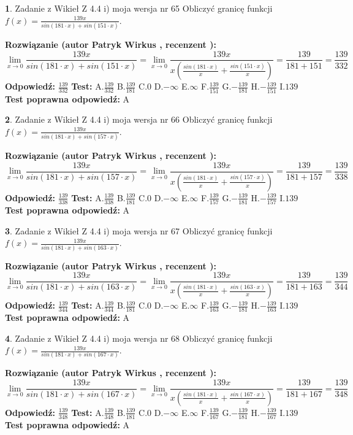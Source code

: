\documentclass[12pt, a4paper]{article}
\theoremstyle{definition} %
\newtheorem{zad}{}
\newcommand{\zadStart}[1]{\begin{zad}#1\newline}
\newcommand{\zadStop}{\end{zad}}
\newcommand{\rozwStart}[2]{\noindent \textbf{Rozwiązanie (autor #1 , recenzent #2): }\newline}
\newcommand{\rozwStop}{\newline}
\newcommand{\odpStart}{\noindent \textbf{Odpowiedź:}\newline}
\newcommand{\odpStop}{\newline}
\newcommand{\testStart}{\noindent \textbf{Test:}\newline}
\newcommand{\testStop}{\newline}
\newcommand{\kluczStart}{\noindent \textbf{Test poprawna odpowiedź:}\newline}
\newcommand{\kluczStop}{\newline}
\begin{document}
\zadStart{Zadanie z Wikieł Z 4.4 i) moja wersja nr 65}
Obliczyć granicę funkcji $f(x)=\frac{139x}{sin(181\cdot x) +sin(151\cdot x)}$.
\zadStop
\rozwStart{Patryk Wirkus}{}
$$\lim\limits_{x\to 0}\frac{139x}{sin(181\cdot x) +sin(151\cdot x)}=\lim\limits_{x\to 0}\frac{139x}{x(\frac{sin(181\cdot x)}{x}+\frac{sin(151\cdot x)}{x})}=\frac{139}{181+151} = \frac{139}{332}$$
\rozwStop
\odpStart
$\frac{139}{332}$
\odpStop
\testStart
A.$\frac{139}{332}$
B.$\frac{139}{181}$
C.$0$
D.$-\infty$
E.$\infty$
F.$\frac{139}{151}$
G.$-\frac{139}{181}$
H.$-\frac{139}{151}$
I.$139$
\testStop
\kluczStart
A
\kluczStop



\zadStart{Zadanie z Wikieł Z 4.4 i) moja wersja nr 66}
Obliczyć granicę funkcji $f(x)=\frac{139x}{sin(181\cdot x) +sin(157\cdot x)}$.
\zadStop
\rozwStart{Patryk Wirkus}{}
$$\lim\limits_{x\to 0}\frac{139x}{sin(181\cdot x) +sin(157\cdot x)}=\lim\limits_{x\to 0}\frac{139x}{x(\frac{sin(181\cdot x)}{x}+\frac{sin(157\cdot x)}{x})}=\frac{139}{181+157} = \frac{139}{338}$$
\rozwStop
\odpStart
$\frac{139}{338}$
\odpStop
\testStart
A.$\frac{139}{338}$
B.$\frac{139}{181}$
C.$0$
D.$-\infty$
E.$\infty$
F.$\frac{139}{157}$
G.$-\frac{139}{181}$
H.$-\frac{139}{157}$
I.$139$
\testStop
\kluczStart
A
\kluczStop



\zadStart{Zadanie z Wikieł Z 4.4 i) moja wersja nr 67}
Obliczyć granicę funkcji $f(x)=\frac{139x}{sin(181\cdot x) +sin(163\cdot x)}$.
\zadStop
\rozwStart{Patryk Wirkus}{}
$$\lim\limits_{x\to 0}\frac{139x}{sin(181\cdot x) +sin(163\cdot x)}=\lim\limits_{x\to 0}\frac{139x}{x(\frac{sin(181\cdot x)}{x}+\frac{sin(163\cdot x)}{x})}=\frac{139}{181+163} = \frac{139}{344}$$
\rozwStop
\odpStart
$\frac{139}{344}$
\odpStop
\testStart
A.$\frac{139}{344}$
B.$\frac{139}{181}$
C.$0$
D.$-\infty$
E.$\infty$
F.$\frac{139}{163}$
G.$-\frac{139}{181}$
H.$-\frac{139}{163}$
I.$139$
\testStop
\kluczStart
A
\kluczStop



\zadStart{Zadanie z Wikieł Z 4.4 i) moja wersja nr 68}
Obliczyć granicę funkcji $f(x)=\frac{139x}{sin(181\cdot x) +sin(167\cdot x)}$.
\zadStop
\rozwStart{Patryk Wirkus}{}
$$\lim\limits_{x\to 0}\frac{139x}{sin(181\cdot x) +sin(167\cdot x)}=\lim\limits_{x\to 0}\frac{139x}{x(\frac{sin(181\cdot x)}{x}+\frac{sin(167\cdot x)}{x})}=\frac{139}{181+167} = \frac{139}{348}$$
\rozwStop
\odpStart
$\frac{139}{348}$
\odpStop
\testStart
A.$\frac{139}{348}$
B.$\frac{139}{181}$
C.$0$
D.$-\infty$
E.$\infty$
F.$\frac{139}{167}$
G.$-\frac{139}{181}$
H.$-\frac{139}{167}$
I.$139$
\testStop
\kluczStart
A
\kluczStop
\end{document}
